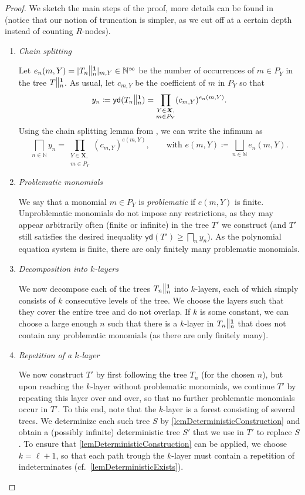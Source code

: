 \documentclass[english,runningheads,a4paper,envcountsame]{llncs}
\newcommand{\Inf}{\bigsqcap}
\newcommand{\Sup}{\bigsqcup}
\newcommand{\Nat}{\mathbb{N}}
\newcommand{\Ninf}{{\mathbb N}^{\infty}}
\newcommand*{\XX}{{\bm X}}
\newcommand*{\yield}{\mathsf{yd}}
\newcommand*{\varcount}[2]{|{#1}|_{#2}}
\newcommand{\cut}[2]{\scalebox{1}[1.3]{$\|$}\vphantom{|}_{#1}^{#2}}
\newcommand{\one}{\tup 1}
\newcommand*{\tup}[1]{\mathbf{#1}}
\begin{document}
\begin{proof}
We sketch the main steps of the proof, more details can be found in \cite{DannertGraNaaTan19}
(notice that our notion of truncation is simpler, as we cut off at a certain depth instead of counting $R$-nodes).

\begin{enumerate}
\item \textit{Chain splitting}

Let $e_n(m,Y) = \varcount {T_n \cut n \one} {m,Y} \in \Ninf$
be the number of occurrences of $m \in P_Y$ in the tree $T \cut n \one$.
As usual, let $c_{m,Y}$ be the coefficient
of $m$ in $P_Y$ so that
\[
  y_n \coloneqq \yield(T_n \cut n \one) =
  \prod_{\substack{Y \in \XX,\\m \in P_Y}} (c_{m,Y})^{e_n(m,Y)}.
\]
Using the chain splitting lemma from \cite{DannertGraNaaTan19},
we can write the infimum as
\[
  \Inf_{n \in \Nat} y_n =
  \prod_{\substack{Y \in \XX,\\m \in P_Y}} (c_{m,Y})^{e(m,Y)}, \qquad \text{with } e(m,Y) \coloneqq \Sup_{n \in \Nat} e_n(m,Y).
\]

\item \textit{Problematic monomials}

We say that a monomial $m \in P_Y$ is \emph{problematic} if $e(m,Y)$ is finite.
Unproblematic monomials do not impose any restrictions,
as they may appear arbitrarily often (finite or infinite) in the tree $T'$ we construct
(and $T'$ still satisfies the desired inequality $\yield(T') \ge \Inf_n y_n$).
As the polynomial equation system is finite, there are only finitely many problematic monomials.

\item \textit{Decomposition into $k$-layers}

We now decompose each of the trees $T_n \cut n \one$ into $k$-layers,
each of which simply consists of $k$ consecutive levels of the tree.
We choose the layers such that they cover the entire tree and do not overlap.
If $k$ is some constant, we can choose a large enough $n$
such that there is a $k$-layer in $T_n \cut n \one$ that does not contain any problematic monomials
(as there are only finitely many).

\item \textit{Repetition of a $k$-layer}

We now construct $T'$ by first following the tree $T_n$ (for the chosen $n$),
but upon reaching the $k$-layer without problematic monomials,
we continue $T'$ by repeating this layer over and over, so that no further problematic monomials occur in $T'$.
To this end, note that the $k$-layer is a forest consisting of several trees.
We determinize each such tree $S$ by \cref{lemDeterministicConstruction} and obtain a (possibly infinite) deterministic tree $S'$ that we use in $T'$ to replace $S$.
To ensure that \cref{lemDeterministicConstruction} can be applied, we choose $k = \ell+1$, so that each path trough the $k$-layer must contain a repetition of indeterminates
(cf.\ \cref{lemDeterministicExists}).


\end{enumerate}
\end{proof}
\end{document}
